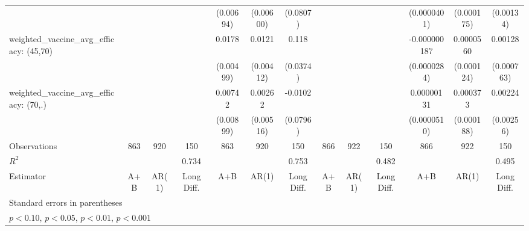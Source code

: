 \begin{table}[htbp]
\begin{tabular}{l*{12}{c}}
                &                  &                  &                  &(0.00694)         &(0.00600)         & (0.0807)         &                  &                  &                  &(0.0000401)         &(0.000175)         &(0.00134)         \\
\addlinespace
weighted\_vaccine\_avg\_efficacy: (45,70)&                  &                  &                  &   0.0178\sym{***}&   0.0121\sym{**} &    0.118\sym{**} &                  &                  &                  &-0.000000187         &0.0000560         &  0.00128\sym{+}  \\
                &                  &                  &                  &(0.00499)         &(0.00412)         & (0.0374)         &                  &                  &                  &(0.0000284)         &(0.000124)         &(0.000763)         \\
\addlinespace
weighted\_vaccine\_avg\_efficacy: (70,.)&                  &                  &                  &  0.00742         &  0.00262         &  -0.0102         &                  &                  &                  &0.00000131         & 0.000373\sym{*}  &  0.00224         \\
                &                  &                  &                  &(0.00899)         &(0.00516)         & (0.0796)         &                  &                  &                  &(0.0000510)         &(0.000188)         &(0.00256)         \\
\midrule
Observations    &      863         &      920         &      150         &      863         &      920         &      150         &      866         &      922         &      150         &      866         &      922         &      150         \\
\(R^{2}\)       &                  &                  &    0.734         &                  &                  &    0.753         &                  &                  &    0.482         &                  &                  &    0.495         \\
Estimator       &      A+B         &    AR(1)         &Long Diff.         &      A+B         &    AR(1)         &Long Diff.         &      A+B         &    AR(1)         &Long Diff.         &      A+B         &    AR(1)         &Long Diff.         \\
\bottomrule
\multicolumn{13}{l}{\footnotesize Standard errors in parentheses}\\
\multicolumn{13}{l}{\footnotesize \sym{+} \(p<0.10\), \sym{*} \(p<0.05\), \sym{**} \(p<0.01\), \sym{***} \(p<0.001\)}\\
\end{tabular}
\end{table}
